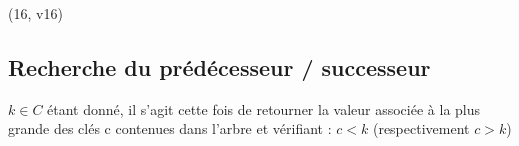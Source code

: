 \documentclass[letterpaper,10pt,english]{jupyterBook}
\begin{document}
\begin{sphinxVerbatimInput}

\begin{sphinxVerbatim}[commandchars=\\\{\}]
\end{sphinxVerbatim}
\end{sphinxVerbatimInput}
\begin{sphinxVerbatimOutput}

\begin{sphinxVerbatim}[commandchars=\\\{\}]
(16, \PYGZsq{}v16\PYGZsq{})
\end{sphinxVerbatim}
\end{sphinxVerbatimOutput}


\subsection{Recherche du prédécesseur / successeur}
\label{\detokenize{notebooks/ABR/ABR:recherche-du-predecesseur-successeur}}
\sphinxAtStartPar
\(k\in C\) étant donné, il s’agit cette fois de retourner la valeur associée à la plus grande des clés c contenues dans l’arbre et vérifiant :  \( c < k\) (respectivement \(c > k\))
\begin{sphinxVerbatimInput}

\begin{sphinxVerbatim}[commandchars=\\\{\}]
 
     \PYG{p}{[}\PYG{p}{]}
         
     \PYG{p}{[}\PYG{p}{]}\PYG{p}{[}\PYG{p}{]}
        \PYG{p}{[}\PYG{p}{]}
         \PYG{p}{[}\PYG{p}{]}\PYG{p}{[}\PYG{p}{]}      
         \PYG{p}{[}\PYG{p}{]}
\end{sphinxVerbatim}
\end{sphinxVerbatimInput}
\end{document}
